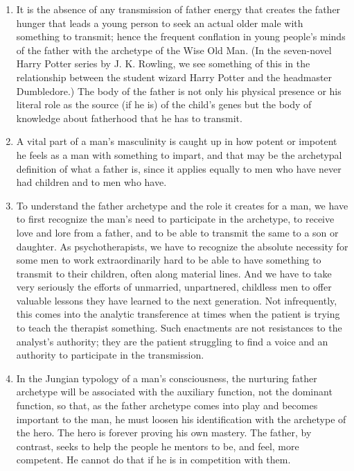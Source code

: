 \begin{enumerate}

\item {} It is the absence of any transmission of
father energy that creates the father hunger that leads a young person to seek
an actual older male with something to transmit; hence the frequent conflation
in young people's minds of the father with the archetype of the Wise Old Man.
(In the seven-novel Harry Potter series by J. K. Rowling, we see something of
this in the relationship between the student wizard Harry Potter and the
headmaster Dumbledore.) The body of the father is not only his physical
presence or his literal role as the source (if he is) of the child's genes but
the body of knowledge about fatherhood that he has to transmit.

\item {} A vital part of a man's masculinity
is caught up in how potent or impotent he feels as a man with something to
impart, and that may be the archetypal definition of what a father is, since it
applies equally to men who have never had children and to men who have.

\item {} To understand the father
archetype and the role it creates for a man, we have to first recognize the
man's need to participate in the archetype, to receive love and lore from a
father, and to be able to transmit the same to a son or daughter. As
psychotherapists, we have to recognize the absolute necessity for some men to
work extraordinarily hard to be able to have something to transmit to their
children, often along material lines. And we have to take very seriously the
efforts of unmarried, unpartnered, childless men to offer valuable lessons they
have learned to the next generation. Not infrequently, this comes into the
analytic transference at times when the patient is trying to teach the
therapist something. Such enactments are not resistances to the analyst's
authority; they are the patient struggling to find a voice and an authority to
participate in the transmission.

\item {} In the Jungian typology of a man's
consciousness, the nurturing father archetype will be associated with the
auxiliary function, not the dominant function, so that, as the father archetype
comes into play and becomes important to the man, he must loosen his
identification with the archetype of the hero. The hero is forever proving his
own mastery. The father, by contrast, seeks to help the people he mentors to
be, and feel, more competent. He cannot do that if he is in competition with
them.

\end{enumerate}

